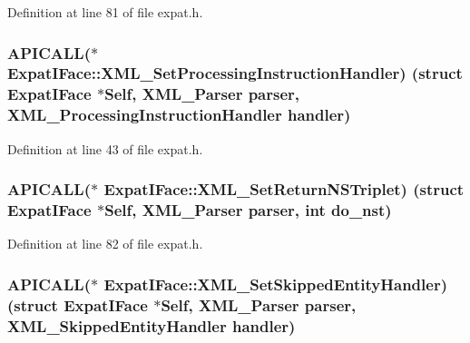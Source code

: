 Definition at line 81 of file expat.\+h.

\subsubsection[{\texorpdfstring{X\+M\+L\+\_\+\+Set\+Processing\+Instruction\+Handler}{XML_SetProcessingInstructionHandler}}]{ A\+P\+I\+C\+A\+LL($\ast$ Expat\+I\+Face\+::\+X\+M\+L\+\_\+\+Set\+Processing\+Instruction\+Handler) (struct {\bf Expat\+I\+Face} $\ast$Self, {\bf X\+M\+L\+\_\+\+Parser} parser, {\bf X\+M\+L\+\_\+\+Processing\+Instruction\+Handler} handler)}\hypertarget{struct_expat_i_face_ab9e054405d9ed39a74c851dd9d76bb25}{}\label{struct_expat_i_face_ab9e054405d9ed39a74c851dd9d76bb25}


Definition at line 43 of file expat.\+h.

\subsubsection[{\texorpdfstring{X\+M\+L\+\_\+\+Set\+Return\+N\+S\+Triplet}{XML_SetReturnNSTriplet}}]{ A\+P\+I\+C\+A\+LL($\ast$ Expat\+I\+Face\+::\+X\+M\+L\+\_\+\+Set\+Return\+N\+S\+Triplet) (struct {\bf Expat\+I\+Face} $\ast$Self, {\bf X\+M\+L\+\_\+\+Parser} parser, {\bf int} do\+\_\+nst)}\hypertarget{struct_expat_i_face_a5f9201e00690cc5cbb2087f489e75da2}{}\label{struct_expat_i_face_a5f9201e00690cc5cbb2087f489e75da2}


Definition at line 82 of file expat.\+h.

\subsubsection[{\texorpdfstring{X\+M\+L\+\_\+\+Set\+Skipped\+Entity\+Handler}{XML_SetSkippedEntityHandler}}]{ A\+P\+I\+C\+A\+LL($\ast$ Expat\+I\+Face\+::\+X\+M\+L\+\_\+\+Set\+Skipped\+Entity\+Handler) (struct {\bf Expat\+I\+Face} $\ast$Self, {\bf X\+M\+L\+\_\+\+Parser} parser, {\bf X\+M\+L\+\_\+\+Skipped\+Entity\+Handler} handler)}\hypertarget{struct_expat_i_face_aefa7c71aeed20fb479302862394ccbce}{}\label{struct_expat_i_face_aefa7c71aeed20fb479302862394ccbce}


